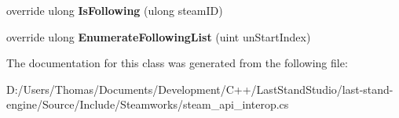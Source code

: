 \begin{DoxyCompactItemize}
\item 
\hypertarget{classValve_1_1Steamworks_1_1CSteamFriends_a0916306df5ee5d6248356b2200e615b5}{}override ulong {\bfseries Is\+Following} (ulong steam\+I\+D)\label{classValve_1_1Steamworks_1_1CSteamFriends_a0916306df5ee5d6248356b2200e615b5}

\item 
\hypertarget{classValve_1_1Steamworks_1_1CSteamFriends_adb4c13946893c86cc75842fea7ae3402}{}override ulong {\bfseries Enumerate\+Following\+List} (uint un\+Start\+Index)\label{classValve_1_1Steamworks_1_1CSteamFriends_adb4c13946893c86cc75842fea7ae3402}

\end{DoxyCompactItemize}


The documentation for this class was generated from the following file\+:\begin{DoxyCompactItemize}
\item 
D\+:/\+Users/\+Thomas/\+Documents/\+Development/\+C++/\+Last\+Stand\+Studio/last-\/stand-\/engine/\+Source/\+Include/\+Steamworks/steam\+\_\+api\+\_\+interop.\+cs\end{DoxyCompactItemize}
